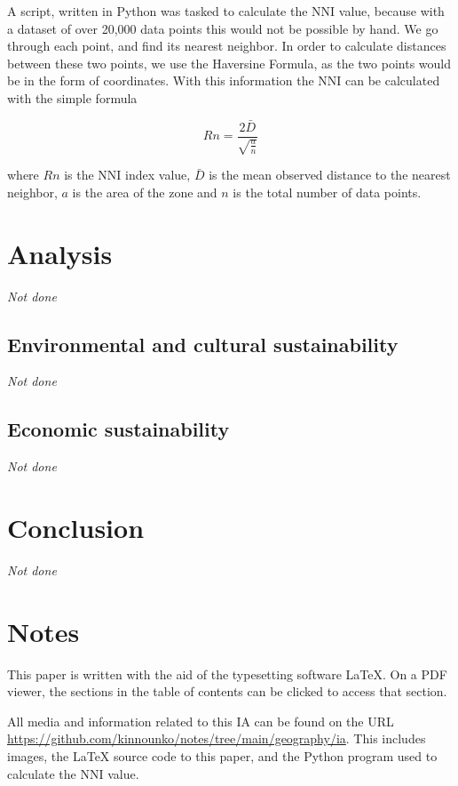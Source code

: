 \documentclass[11pt,letterpaper]{article}
\begin{document}
A script, written in Python was tasked to calculate the NNI value, because with a dataset of over 20,000 data points this would not be possible by hand. We go through each point, and find its nearest neighbor. In order to calculate distances between these two points, we use the Haversine Formula, as the two points would be in the form of coordinates. With this information the NNI can be calculated with the simple formula

$$Rn = \frac{2 \bar D}{\sqrt{\frac{a}{n}}}$$

where $Rn$ is the NNI index value, $\bar D$ is the mean observed distance to the nearest neighbor, $a$ is the area of the zone and $n$ is the total number of data points.




\section{Analysis}
\label{sec:analysis}

\textit{Not done}

\subsection{Environmental and cultural sustainability}
\textit{Not done}

\subsection{Economic sustainability}
\textit{Not done}

\section{Conclusion}
\label{sec:conclusion}

\textit{Not done}

\newpage
{}


\section*{Notes}
\label{sec:notes}

This paper is written with the aid of the typesetting software \LaTeX. On a PDF viewer, the sections in the table of contents can be clicked to access that section.

All media and information related to this IA can be found on the URL \url{https://github.com/kinnounko/notes/tree/main/geography/ia}. This includes images, the \LaTeX{} source code to this paper, and the Python program used to calculate the NNI value.
\end{document}
